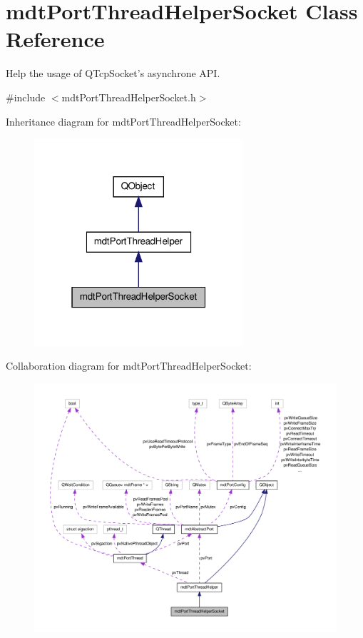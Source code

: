 \hypertarget{classmdt_port_thread_helper_socket}{\section{mdt\-Port\-Thread\-Helper\-Socket Class Reference}
\label{classmdt_port_thread_helper_socket}
}


Help the usage of Q\-Tcp\-Socket's asynchrone A\-P\-I.  




{\ttfamily \#include $<$mdt\-Port\-Thread\-Helper\-Socket.\-h$>$}



Inheritance diagram for mdt\-Port\-Thread\-Helper\-Socket\-:\nopagebreak
\begin{figure}[H]
\begin{center}
\leavevmode
\includegraphics[width=220pt]{classmdt_port_thread_helper_socket__inherit__graph}
\end{center}
\end{figure}


Collaboration diagram for mdt\-Port\-Thread\-Helper\-Socket\-:\nopagebreak
\begin{figure}[H]
\begin{center}
\leavevmode
\includegraphics[width=350pt]{classmdt_port_thread_helper_socket__coll__graph}
\end{center}
\end{figure}
